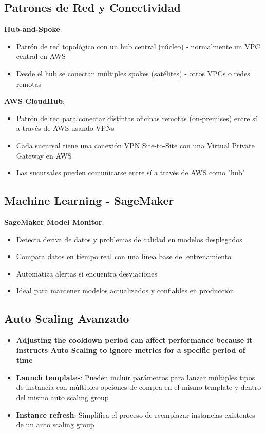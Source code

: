 \documentclass[12pt,a4paper]{report}
\newcommand{\important}[1]{\textcolor{dangerred}{\textbf{#1}}}
\begin{document}
\subsection{Patrones de Red y Conectividad}

\textbf{Hub-and-Spoke}:
\begin{itemize}
    \item Patrón de red topológico con un hub central (núcleo) - normalmente un VPC central en AWS
    \item Desde el hub se conectan múltiples spokes (satélites) - otros VPCs o redes remotas
\end{itemize}

\textbf{AWS CloudHub}:
\begin{itemize}
    \item Patrón de red para conectar distintas oficinas remotas (on-premises) entre sí a través de AWS usando VPNs
    \item Cada sucursal tiene una conexión VPN Site-to-Site con una Virtual Private Gateway en AWS
    \item Las sucursales pueden comunicarse entre sí a través de AWS como "hub"
\end{itemize}

\subsection{Machine Learning - SageMaker}

\textbf{SageMaker Model Monitor}:
\begin{itemize}
    \item Detecta deriva de datos y problemas de calidad en modelos desplegados
    \item Compara datos en tiempo real con una línea base del entrenamiento
    \item Automatiza alertas si encuentra desviaciones
    \item Ideal para mantener modelos actualizados y confiables en producción
\end{itemize}

\subsection{Auto Scaling Avanzado}

\begin{itemize}
    \item \important{Adjusting the cooldown period can affect performance because it instructs Auto Scaling to ignore metrics for a specific period of time}
    \item \textbf{Launch templates}: Pueden incluir parámetros para lanzar múltiples tipos de instancia con múltiples opciones de compra en el mismo template y dentro del mismo auto scaling group
    \item \textbf{Instance refresh}: Simplifica el proceso de reemplazar instancias existentes de un auto scaling group
\end{itemize}
\end{document}
